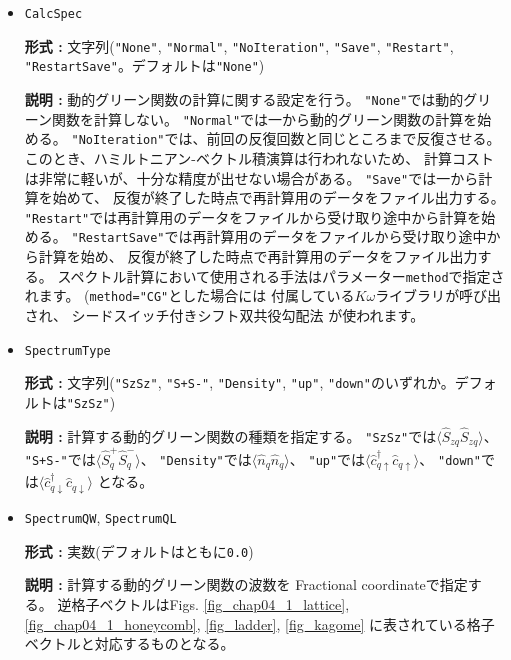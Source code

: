 \begin{itemize}
\item \verb|CalcSpec|
  
  {\bf 形式 :} 文字列(\verb|"None"|, \verb|"Normal"|, \verb|"NoIteration"|,  
  \verb|"Save"|, \verb|"Restart"|, \verb|"RestartSave"|。デフォルトは\verb|"None"|)

  {\bf 説明 :} 動的グリーン関数の計算に関する設定を行う。
  \verb|"None"|では動的グリーン関数を計算しない。
  \verb|"Normal"|では一から動的グリーン関数の計算を始める。
  \verb|"NoIteration"|では、前回の反復回数と同じところまで反復させる。
  このとき、ハミルトニアン-ベクトル積演算は行われないため、
  計算コストは非常に軽いが、十分な精度が出せない場合がある。
  \verb|"Save"|では一から計算を始めて、
  反復が終了した時点で再計算用のデータをファイル出力する。
  \verb|"Restart"|では再計算用のデータをファイルから受け取り途中から計算を始める。
  \verb|"RestartSave"|では再計算用のデータをファイルから受け取り途中から計算を始め、
  反復が終了した時点で再計算用のデータをファイル出力する。
  スペクトル計算において使用される手法はパラメーター\verb|method|で指定されます。
  (\verb|method="CG"|とした場合には
  付属している$K\omega$ライブラリ\cite{komega}が呼び出され、
  シードスイッチ付きシフト双共役勾配法
  \cite{Frommer2003,doi:10.1143/JPSJ.77.114713}が使われます。

\item \verb|SpectrumType|
  
  {\bf 形式 :} 文字列(\verb|"SzSz"|, \verb|"S+S-"|, \verb|"Density"|,  
  \verb|"up"|, \verb|"down"|のいずれか。デフォルトは\verb|"SzSz"|)

  {\bf 説明 :} 計算する動的グリーン関数の種類を指定する。
  \verb|"SzSz"|では$\langle {\hat S}_{z q} {\hat S}_{z q}\rangle$、
  \verb|"S+S-"|では$\langle {\hat S}^{+}_{q} {\hat S}^{-}_{q}\rangle$、
  \verb|"Density"|では$\langle {\hat n}_{q} {\hat n}_{q}\rangle$、
  \verb|"up"|では$\langle {\hat c}^{\dagger}_{q \uparrow} {\hat c}_{q \uparrow}\rangle$、
  \verb|"down"|では$\langle {\hat c}^{\dagger}_{q \downarrow} {\hat c}_{q \downarrow}\rangle$
  となる。

\item \verb|SpectrumQW|, \verb|SpectrumQL|
  
  {\bf 形式 :} 実数(デフォルトはともに\verb|0.0|)

  {\bf 説明 :} 計算する動的グリーン関数の波数を
  Fractional coordinateで指定する。
  逆格子ベクトルはFigs.
  \ref{fig_chap04_1_lattice}, \ref{fig_chap04_1_honeycomb},
  \ref{fig_ladder}, \ref{fig_kagome}
  に表されている格子ベクトルと対応するものとなる。


\end{itemize}
